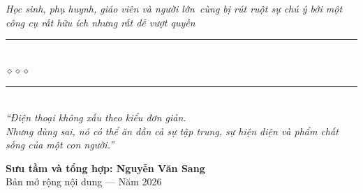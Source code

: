 \begin{titlepage}
\begin{center}
	{\fontsize{15}{19}\selectfont\color{bookprimary!90!black}\itshape
		Học sinh, phụ huynh, giáo viên và người lớn\
		cùng bị rút ruột sự chú ý bởi một công cụ rất hữu ích nhưng rất dễ vượt quyền}\\[0.95cm]

	{\color{bookprimary!55}\rule{7cm}{1pt}}\\[5pt]
	{\color{booksecondary!80!black}\large$\diamond$\hspace{1cm}$\diamond$\hspace{1cm}$\diamond$}\\[5pt]
	{\color{bookprimary!55}\rule{7cm}{1pt}}\\[1.3cm]

	{\normalsize\itshape\color{bookprimary!90!black}
	 ``Điện thoại không xấu theo kiểu đơn giản.\\
	 Nhưng dùng sai, nó có thể ăn dần cả sự tập trung, sự hiện diện và phẩm chất sống của một con người.''}

	\vfill

	{\fontsize{16}{20}\selectfont\bfseries\color{bookprimary!90!black}
		Sưu tầm và tổng hợp: \textbf{Nguyễn Văn Sang}}\\[0.4cm]
	{\small\color{gray} Bản mở rộng nội dung --- Năm 2026}\\[0.5cm]
\end{center}

\afterpage{\nopagecolor}
\end{titlepage}